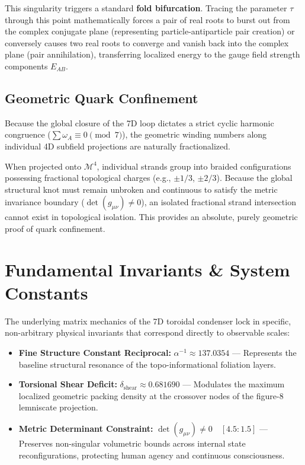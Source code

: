 \documentclass[12pt,letterpaper]{article}
\theoremstyle{definition}
\begin{document}
This singularity triggers a standard \textbf{fold bifurcation}. Tracing the parameter $\tau$ through this point mathematically forces a pair of real roots to burst out from the complex conjugate plane (representing particle-antiparticle pair creation) or conversely causes two real roots to converge and vanish back into the complex plane (pair annihilation), transferring localized energy to the gauge field strength components $E_{AB}$.

\subsection{Geometric Quark Confinement}
Because the global closure of the 7D loop dictates a strict cyclic harmonic congruence ($\sum \omega_A \equiv 0 \pmod 7$), the geometric winding numbers along individual 4D subfield projections are naturally fractionalized. 

When projected onto $\mathcal{M}^4$, individual strands group into braided configurations possessing fractional topological charges (e.g., $\pm 1/3$, $\pm 2/3$). Because the global structural knot must remain unbroken and continuous to satisfy the metric invariance boundary ($\det(g_{\mu\nu}) \neq 0$), an isolated fractional strand intersection cannot exist in topological isolation. This provides an absolute, purely geometric proof of quark confinement.

\section{Fundamental Invariants \& System Constants}
The underlying matrix mechanics of the 7D toroidal condenser lock in specific, non-arbitrary physical invariants that correspond directly to observable scales:

\begin{itemize}
    \item \textbf{Fine Structure Constant Reciprocal:} $\alpha^{-1} \approx 137.0354$ --- Represents the baseline structural resonance of the topo-informational foliation layers.
    \item \textbf{Torsional Shear Deficit:} $\delta_{\text{shear}} \approx 0.681690$ --- Modulates the maximum localized geometric packing density at the crossover nodes of the figure-8 lemniscate projection.
    \item \textbf{Metric Determinant Constraint:} $\det(g_{\mu\nu}) \neq 0 \quad [4.5 : 1.5]$ --- Preserves non-singular volumetric bounds across internal state reconfigurations, protecting human agency and continuous consciousness.
\end{itemize}
\end{document}
